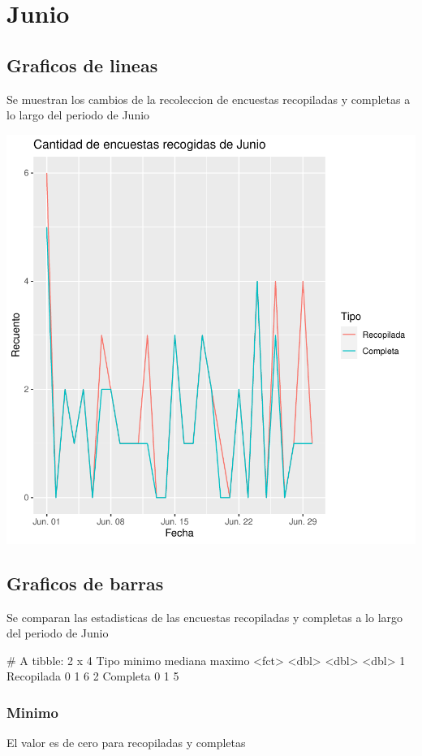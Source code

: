 \documentclass{article}
\begin{document}
\section{Junio}
\subsection{Graficos de lineas}
Se muestran los cambios de la recoleccion de encuestas recopiladas y completas a lo largo del periodo de Junio

\includegraphics{seguimento2-088}

\subsection{Graficos de barras}
Se comparan las estadisticas de las encuestas recopiladas y completas a lo largo del periodo de Junio

\begin{Schunk}
\begin{Soutput}
# A tibble: 2 x 4
  Tipo       minimo mediana maximo
  <fct>       <dbl>   <dbl>  <dbl>
1 Recopilada      0       1      6
2 Completa        0       1      5
\end{Soutput}
\end{Schunk}

\subsubsection{Minimo}
El valor es de cero para recopiladas y completas
\end{document}
